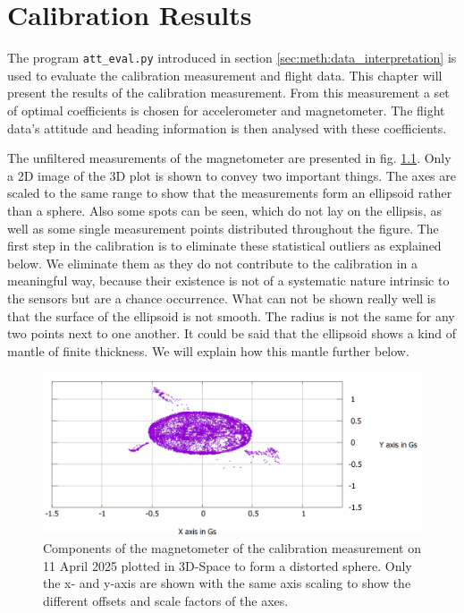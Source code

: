 \chapter{Calibration Results \label{ch:calibration_results}}
The program \verb|att_eval.py| introduced in section \ref{sec:meth:data_interpretation} is used to evaluate the calibration measurement and flight data. This chapter will present the results of the calibration measurement. From this measurement a set of optimal coefficients is chosen for accelerometer and magnetometer. The flight data's attitude and heading information is then analysed with these coefficients.

The unfiltered measurements of the magnetometer are presented in fig. \ref{fig:res:raw_cali}. Only a 2D image of the 3D plot is shown to convey two important things. The axes are scaled to the same range to show that the measurements form an ellipsoid rather than a sphere. Also some spots can be seen, which do not lay on the ellipsis, as well as some single measurement points distributed throughout the figure. The first step in the calibration is to eliminate these statistical outliers as explained below. We eliminate them as they do not contribute to the calibration in a meaningful way, because their existence is not of a systematic nature intrinsic to the sensors but are a chance occurrence. What can not be shown really well is that the surface of the ellipsoid is not smooth. The radius is not the same for any two points next to one another. It could be said that the ellipsoid shows a kind of mantle of finite thickness. We will explain how this mantle further below.

\begin{figure}[H]
    \centering
    \includegraphics[width=\linewidth]{images/04_results/raw_sphere_2025-04-11_x_y_axes.png}
    \caption[Components of the magnetometer of the calibration measurement on 11 April 2025 plotted in 3D-Space to form a distorted sphere.]{Components of the magnetometer of the calibration measurement on 11 April 2025 plotted in 3D-Space to form a distorted sphere. Only the x- and y-axis are shown with the same axis scaling to show the different offsets and scale factors of the axes.}
    \label{fig:res:raw_cali}
\end{figure}


